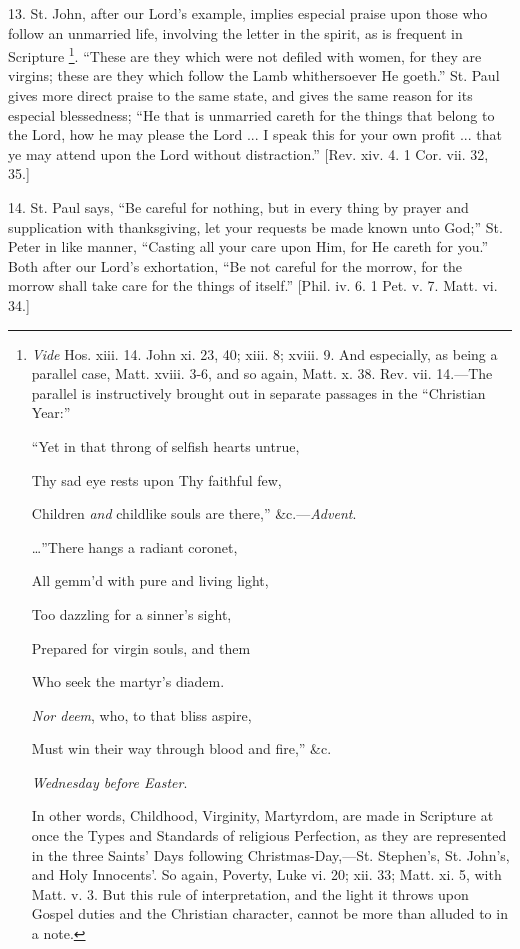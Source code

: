 13. St. John, after our Lord's example, implies especial praise upon
those who follow an unmarried life, involving the letter in the spirit,
as is frequent in Scripture \footnote{\emph{Vide} Hos. xiii. 14. John xi. 23, 40;
xiii. 8; xviii. 9. And especially, as being a parallel case, Matt. xviii.
3-6, and so again, Matt. x. 38. Rev. vii. 14.—The parallel is
instructively brought out in separate passages in the ``Christian
Year:''

``Yet in that throng of selfish hearts untrue,

Thy sad eye rests upon Thy faithful few,

Children \emph{and} childlike souls are there,'' \&c.—\emph{Advent}.

…''There hangs a radiant coronet,

All gemm'd with pure and living light,

Too dazzling for a sinner's sight,

Prepared for virgin souls, and them

Who seek the martyr's diadem.

\emph{Nor deem}, who, to that bliss aspire,

Must win their way through blood and fire,'' \&c.

\emph{Wednesday before Easter}.

In other words, Childhood, Virginity, Martyrdom, are made in
Scripture at once the Types and Standards of religious Perfection, as
they are represented in the three Saints' Days following Christmas-Day,—St.
Stephen's, St. John's, and Holy Innocents'. So again, Poverty, Luke vi.
20; xii. 33; Matt. xi. 5, with Matt. v. 3. But this rule of
interpretation, and the light it throws upon Gospel duties and the
Christian character, cannot be more than alluded to in a note.}.
``These are they which were not defiled with women, for they are
virgins; these are they which follow the Lamb whithersoever He goeth.''
St. Paul gives more direct praise to the same state, and gives the same
reason for its especial blessedness; ``He that is unmarried careth
for the things that belong to the Lord, how he may please the Lord ... I
speak this for your own profit ... that ye may attend upon the Lord
without distraction.'' [Rev. xiv. 4. 1 Cor. vii. 32, 35.]

14. St. Paul says, ``Be careful for nothing, but in every thing
by prayer and supplication with thanksgiving, let your requests be made
known unto God;'' St. Peter in like manner, ``Casting all your
care upon Him, for He careth for you.'' Both after our Lord's
exhortation, ``Be not careful for the morrow, for the morrow shall
take care for the things of itself.'' [Phil. iv. 6. 1 Pet. v. 7.
Matt. vi. 34.]

